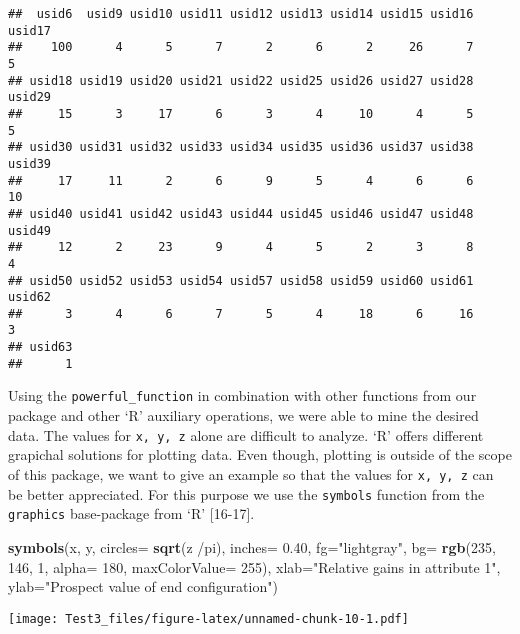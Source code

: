 \documentclass[]{article}
\newenvironment{Shaded}{\begin{snugshade}}{\end{snugshade}}
\newcommand{\KeywordTok}[1]{\textcolor[rgb]{0.13,0.29,0.53}{\textbf{{#1}}}}
\newcommand{\DataTypeTok}[1]{\textcolor[rgb]{0.13,0.29,0.53}{{#1}}}
\newcommand{\DecValTok}[1]{\textcolor[rgb]{0.00,0.00,0.81}{{#1}}}
\newcommand{\FloatTok}[1]{\textcolor[rgb]{0.00,0.00,0.81}{{#1}}}
\newcommand{\StringTok}[1]{\textcolor[rgb]{0.31,0.60,0.02}{{#1}}}
\newcommand{\NormalTok}[1]{{#1}}
\begin{document}
\begin{verbatim}
##  usid6  usid9 usid10 usid11 usid12 usid13 usid14 usid15 usid16 usid17 
##    100      4      5      7      2      6      2     26      7      5 
## usid18 usid19 usid20 usid21 usid22 usid25 usid26 usid27 usid28 usid29 
##     15      3     17      6      3      4     10      4      5      5 
## usid30 usid31 usid32 usid33 usid34 usid35 usid36 usid37 usid38 usid39 
##     17     11      2      6      9      5      4      6      6     10 
## usid40 usid41 usid42 usid43 usid44 usid45 usid46 usid47 usid48 usid49 
##     12      2     23      9      4      5      2      3      8      4 
## usid50 usid52 usid53 usid54 usid57 usid58 usid59 usid60 usid61 usid62 
##      3      4      6      7      5      4     18      6     16      3 
## usid63 
##      1
\end{verbatim}

Using the \texttt{powerful\_function} in combination with other
functions from our package and other `R' auxiliary operations, we were
able to mine the desired data. The values for \texttt{x, y, z} alone are
difficult to analyze. `R' offers different grapichal solutions for
plotting data. Even though, plotting is outside of the scope of this
package, we want to give an example so that the values for
\texttt{x, y, z} can be better appreciated. For this purpose we use the
\texttt{symbols} function from the \texttt{graphics} base-package from
`R' {[}16-17{]}.

\begin{Shaded}
\begin{Highlighting}[]
\KeywordTok{symbols}\NormalTok{(x, y, }\DataTypeTok{circles=} \KeywordTok{sqrt}\NormalTok{(z /pi), }
        \DataTypeTok{inches=} \FloatTok{0.40}\NormalTok{, }\DataTypeTok{fg=}\StringTok{"lightgray"}\NormalTok{, }
        \DataTypeTok{bg=} \KeywordTok{rgb}\NormalTok{(}\DecValTok{235}\NormalTok{, }\DecValTok{146}\NormalTok{, }\DecValTok{1}\NormalTok{, }\DataTypeTok{alpha=} \DecValTok{180}\NormalTok{, }\DataTypeTok{maxColorValue=} \DecValTok{255}\NormalTok{),}
        \DataTypeTok{xlab=}\StringTok{"Relative gains in attribute 1"}\NormalTok{, }
        \DataTypeTok{ylab=}\StringTok{"Prospect value of end configuration"}\NormalTok{)}
\end{Highlighting}
\end{Shaded}

\texttt{[image: Test3\_files/figure-latex/unnamed-chunk-10-1.pdf]}
\end{document}
